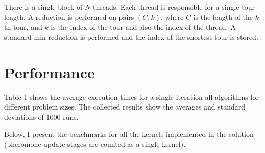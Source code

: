 \documentclass[12pt, a4paper]{article}
\begin{document}
There is a single block of $N$ threads. Each thread is responsible for a single
tour length. A reduction is performed on pairs $(C,k)$, where $C$ is the length
of the $k$-th tour, and $k$ is the index of the tour and also the index of the
thread. A standard min reduction is performed and the index of the shortest
tour is stored.

\section*{Performance}

\begin{table}[h]
    \centering
    \caption{Average execution times (ms.) on Titan V for ACOTSP implementations.}
\end{table}

Table 1 shows the average execution times for a single iteration all algorithms
for different problem sizes. The collected results show the averages and
standard deviations of 1000 runs.

Below, I present the benchmarks for all the kernels implemented in the
solution (pheromone update stages are counted as a single kernel).
\end{document}
